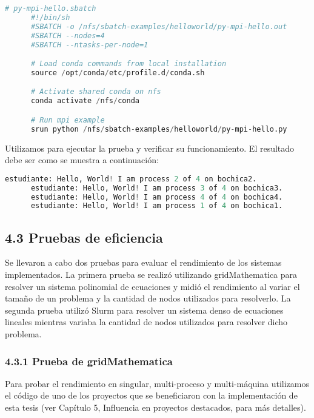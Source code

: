 \begin{spacing}{1.5}
  \begin{lstlisting}[language=python]
      # py-mpi-hello.sbatch
      #!/bin/sh
      #SBATCH -o /nfs/sbatch-examples/helloworld/py-mpi-hello.out
      #SBATCH --nodes=4
      #SBATCH --ntasks-per-node=1

      # Load conda commands from local installation
      source /opt/conda/etc/profile.d/conda.sh

      # Activate shared conda on nfs
      conda activate /nfs/conda

      # Run mpi example
      srun python /nfs/sbatch-examples/helloworld/py-mpi-hello.py
    \end{lstlisting}

  Utilizamos  para ejecutar la prueba y verificar su funcionamiento. El resultado debe ser como se muestra a continuación:

  \begin{lstlisting}[language=python]
      estudiante: Hello, World! I am process 2 of 4 on bochica2.
      estudiante: Hello, World! I am process 3 of 4 on bochica3.
      estudiante: Hello, World! I am process 4 of 4 on bochica4.
      estudiante: Hello, World! I am process 1 of 4 on bochica1. 
      \end{lstlisting}

  \subsection{4.3 Pruebas de eficiencia}  \label{chap:4.3}

  Se llevaron a cabo dos pruebas para evaluar el rendimiento de los sistemas implementados. La primera prueba se realizó utilizando gridMathematica para resolver un sistema polinomial de ecuaciones y midió el rendimiento al variar el tamaño de un problema y la cantidad de nodos utilizados para resolverlo. La segunda prueba utilizó Slurm para resolver un sistema denso de ecuaciones lineales mientras variaba la cantidad de nodos utilizados para resolver dicho problema.

  \subsubsection{4.3.1 Prueba de gridMathematica}

  Para probar el rendimiento en singular, multi-proceso y multi-máquina utilizamos el código de uno de los proyectos que se beneficiaron con la implementación de esta tesis (ver Capítulo 5, Influencia en proyectos destacados, para más detalles).


\end{spacing}
